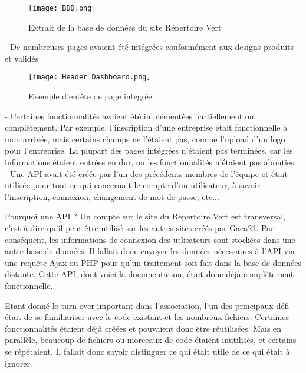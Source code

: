 \begin{figure}[H]
    \centering
    \texttt{[image: BDD.png]}
    \caption{Extrait de la base de données du site Répertoire Vert}
\end{figure}

- De nombreuses pages avaient été intégrées conformément aux designs produits et validés \\

\begin{figure}[H]
    \centering
    \texttt{[image: Header Dashboard.png]}
    \caption{Exemple d'entête de page intégrée}
\end{figure}

- Certaines fonctionnalités avaient été implémentées partiellement ou complètement. Par exemple, l'inscription d'une entreprise était fonctionnelle à mon arrivée, mais certains champs ne l'étaient pas, comme l'upload d'un logo pour l'entreprise.
La plupart des pages intégrées n'étaient pas terminées, car les informations étaient entrées en dur, ou les fonctionnalités n'étaient pas abouties. \\

- Une API avait été créée par l'un des précédents membres de l'équipe et était utilisée pour tout ce qui concernait le compte d'un utilisateur, à savoir l'inscription, connexion, changement de mot de passe, etc... \\

\begin{callout}{Pourquoi une API ?}
Un compte sur le site du Répertoire Vert est transversal, c'est-à-dire qu'il peut être utilisé sur les autres sites créés par Gaea21. 
Par conséquent, les informations de connexion des utlisateurs sont stockées dans une autre base de données. 
Il fallait donc envoyer les données nécessaires à l'API via une requête Ajax ou PHP pour qu'un traitement soit fait dans la base de données distante. 
Cette API, dont voici la \href{https://gaea21user.sustlivprogram.org/swagger/#/}{documentation}, était donc déjà complètement fonctionnelle.
\end{callout}

Etant donné le turn-over important dans l'association, l'un des principaux défi était de se familiariser avec le code existant et les nombreux fichiers. 
Certaines fonctionnalités étaient déjà créées et pouvaient donc être réutilisées. Mais en parallèle, beaucoup de fichiers ou morceaux de code étaient inutilisés, et certains se répétaient. 
Il fallait donc savoir distinguer ce qui était utile de ce qui était à ignorer.

